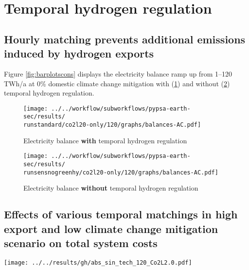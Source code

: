 \section{Temporal hydrogen regulation}
\label{subsec:gh_constraint_effects}

\subsection{Hourly matching prevents additional emissions induced by hydrogen exports}
Figure \ref{fig:barplotscons} displays the electricity balance ramp up from 1--120 TWh/a at 0\% domestic climate change mitigation with (\ref{fig:balances_AC_monthlymatch}) and without (\ref{fig:balances_AC_nogreen}) temporal hydrogen regulation.

\begin{figure*}[h!]
    \centering
    \begin{subfigure}[b]{0.49\linewidth}
        \centering
        \texttt{[image: ../../workflow/subworkflows/pypsa-earth-sec/results/\\runstandard/co2l20-only/120/graphs/balances-AC.pdf]}
        \caption{Electricity balance {\bf with} temporal hydrogen regulation}
        \label{fig:balances_AC_monthlymatch}
    \end{subfigure}
    \hfill
    \begin{subfigure}[b]{0.49\linewidth}
        \centering
        \texttt{[image: ../../workflow/subworkflows/pypsa-earth-sec/results/\\runsensnogreenhy/co2l20-only/120/graphs/balances-AC.pdf]}
        \caption{Electricity balance {\bf without} temporal hydrogen regulation}
        \label{fig:balances_AC_nogreen}
    \end{subfigure}
    \hfill
    \caption{Electricity balance ramp up from 1--120 TWh/a at 0\% domestic climate change mitigation with (\ref{fig:balances_AC_monthlymatch}) and without (\ref{fig:balances_AC_nogreen}) temporal hydrogen regulation}
    \label{fig:barplotscons}
\end{figure*}


\subsection{Effects of various temporal matchings in high export and low climate change mitigation scenario on total system costs}

\begin{figure*}[h]
    \centering
    \texttt{[image: ../../results/gh/abs\_sin\_tech\_120\_Co2L2.0.pdf]}
    \caption{Total system costs at 120 TWh/a export and 0\% domestic climate change mitigation. Stricter temporal hydrogen regulation mainly increases the total CAPEX of additional solar PV, electrolysis and hydrogen storage. In return, the OPEX of fossil generation (mainly gas), decreases. The large share of oil OPEX is independent of temporal hydrogen regulation, since these costs are mainly linked to combustion engine cars with demands independent of temporal hydrogen regulation.}
    \label{fig:tsc-120-0}
\end{figure*}




